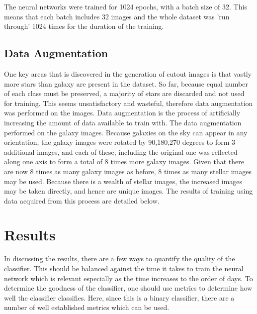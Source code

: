 \documentclass[a4paper,fleqn,usenatbib]{mnras}
\begin{document}
The neural networks were trained for 1024 epochs, with a batch size of 32. This means that each batch includes 32 images and the whole dataset was 'run through' 1024 times for the duration of the training. 

\subsection{Data Augmentation}
One key areas that is discovered in the generation of cutout images is that vastly more stars than galaxy are present in the dataset. So far, because equal number of each class must be preserved, a majority of stars are discarded and not used for training. This seems unsatisfactory and wasteful, therefore data augmentation was performed on the images. Data augmentation is the process of artificially increasing the amount of data available to train with. The data augmentation performed on the galaxy images. Because galaxies on the sky can appear in any orientation, the galaxy images were rotated by 90,180,270 degrees to form 3 additional images, and each of these, including the original one was reflected along one axis to form a total of 8 times more galaxy images. Given that there are now 8 times as many galaxy images as before, 8 times as many stellar images may be used. Because there is a wealth of stellar images, the increased images may be taken directly, and hence are unique images. The results of training using data acquired from this process are detailed below.
\section{Results}
In discussing the results, there are a few ways to quantify the quality of the classifier. This should be balanced against the time it takes to train the neural network which is relevant especially as the time increases to the order of days. To determine the goodness of the classifier, one should use metrics to determine how well the classifier classifies. Here, since this is a binary classifier, there are a  number of well established metrics which can be used. 
\end{document}
